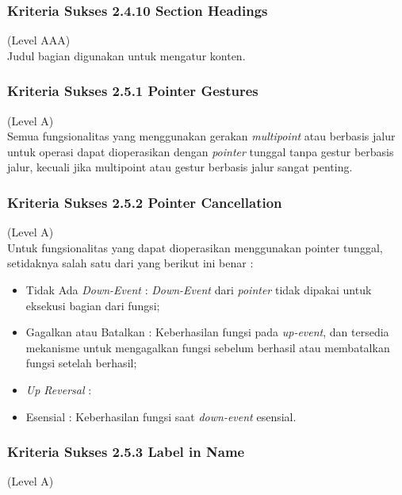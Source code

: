 \subsubsection{Kriteria Sukses 2.4.10 Section Headings}
\label{sec:kriteria_2.4.10}
(Level AAA) \\

Judul bagian digunakan untuk mengatur konten.

\subsubsection{Kriteria Sukses 2.5.1 Pointer Gestures}
\label{sec:kriteria_2.5.1}
(Level A) \\

Semua fungsionalitas yang menggunakan gerakan \textit{multipoint} atau berbasis jalur untuk operasi dapat dioperasikan dengan \textit{pointer} tunggal tanpa gestur berbasis jalur, kecuali jika multipoint atau gestur berbasis jalur sangat penting.

\subsubsection{Kriteria Sukses 2.5.2 Pointer Cancellation}
\label{sec:kriteria_2.5.2}
(Level A) \\

Untuk fungsionalitas yang dapat dioperasikan menggunakan pointer tunggal, setidaknya salah satu dari yang berikut ini benar :

\begin{itemize}
	\item Tidak Ada \textit{Down-Event} : \textit{Down-Event} dari \textit{pointer} tidak dipakai untuk eksekusi bagian dari fungsi;
	\item Gagalkan atau Batalkan : Keberhasilan fungsi pada \textit{up-event}, dan tersedia mekanisme untuk mengagalkan fungsi sebelum berhasil atau membatalkan fungsi setelah berhasil;
	\item \textit{Up Reversal} : 
	\item Esensial : Keberhasilan fungsi saat \textit{down-event} esensial.
\end{itemize}

\subsubsection{Kriteria Sukses 2.5.3 Label in Name}
\label{sec:kriteria_2.5.3}
(Level A) \\


